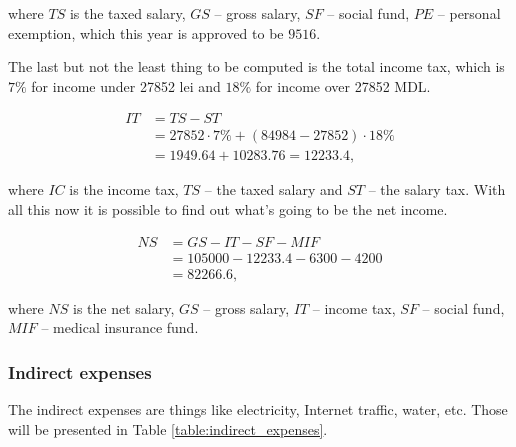 \noindent
where $TS$ is the taxed salary, $GS$ -- gross salary, $SF$ -- social fund, $PE$ -- personal exemption, which this year is approved to be $9516$.

The last but not the least thing to be computed is the total income tax, which is $7\%$ for income under 27852 lei and $18\%$ for income over 27852 MDL.

\begin{equation}
\begin{split}
 IT &= TS - ST \\
	    &= 27852 \cdot 7\% + (84984 - 27852) \cdot 18\% \\
	    & = 1949.64 + 10283.76 = 12233.4,
 \end{split}
\end{equation}

\noindent
where $IC$ is the income tax, $TS$ -- the taxed salary and $ST$ -- the salary tax. With all this now it is possible to find out what's going to be the net income.

\begin{equation}
\begin{split}
 NS &= GS - IT - SF - MIF \\
            &= 105000 - 12233.4 - 6300 - 4200 \\
            &= 82266.6,
\end{split}
\end{equation}

\noindent
where $NS$ is the net salary, $GS$ -- gross salary, $IT$ -- income tax, $SF$ -- social fund, $MIF$ -- medical insurance fund.

\subsubsection{Indirect expenses}
The indirect expenses are things like electricity, Internet traffic, water, etc. Those will be presented in Table \ref{table:indirect_expenses}.

